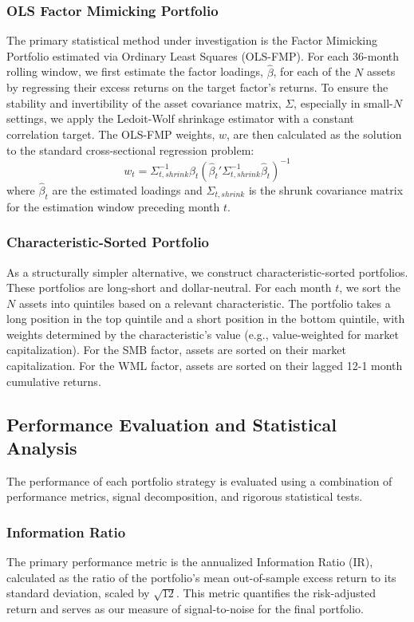 \documentclass[]{article}
\begin{document}
\subsubsection{OLS Factor Mimicking Portfolio}
The primary statistical method under investigation is the Factor Mimicking Portfolio estimated via Ordinary Least Squares (OLS-FMP). For each 36-month rolling window, we first estimate the factor loadings, $\hat{\beta}$, for each of the $N$ assets by regressing their excess returns on the target factor's returns. To ensure the stability and invertibility of the asset covariance matrix, $\Sigma$, especially in small-$N$ settings, we apply the Ledoit-Wolf shrinkage estimator with a constant correlation target. The OLS-FMP weights, $w$, are then calculated as the solution to the standard cross-sectional regression problem:
\begin{equation}
w_t = \Sigma_{t, shrink}^{-1}\hat{\beta}_t(\hat{\beta}_t'\Sigma_{t, shrink}^{-1}\hat{\beta}_t)^{-1}
\end{equation}
where $\hat{\beta}_t$ are the estimated loadings and $\Sigma_{t, shrink}$ is the shrunk covariance matrix for the estimation window preceding month $t$.

\subsubsection{Characteristic-Sorted Portfolio}
As a structurally simpler alternative, we construct characteristic-sorted portfolios. These portfolios are long-short and dollar-neutral. For each month $t$, we sort the $N$ assets into quintiles based on a relevant characteristic. The portfolio takes a long position in the top quintile and a short position in the bottom quintile, with weights determined by the characteristic's value (e.g., value-weighted for market capitalization). For the SMB factor, assets are sorted on their market capitalization. For the WML factor, assets are sorted on their lagged 12-1 month cumulative returns.

\subsection{Performance Evaluation and Statistical Analysis}
The performance of each portfolio strategy is evaluated using a combination of performance metrics, signal decomposition, and rigorous statistical tests.

\subsubsection{Information Ratio}
The primary performance metric is the annualized Information Ratio (IR), calculated as the ratio of the portfolio's mean out-of-sample excess return to its standard deviation, scaled by $\sqrt{12}$. This metric quantifies the risk-adjusted return and serves as our measure of signal-to-noise for the final portfolio.
\end{document}
